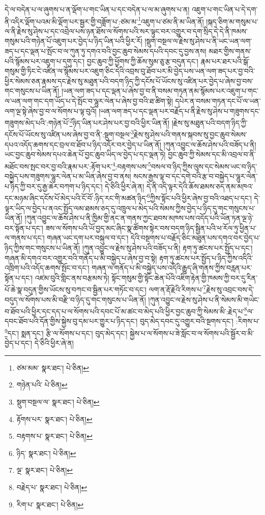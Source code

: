 དེ་ལ་བདེན་པ་ལ་ཞུགས་པ་ན་ལྡོག་པ་གང་ཡིན་པ་དང་བདེན་པ་ལ་མ་ཞུགས་པ་ན། འཇུག་པ་གང་ཡིན་པ་དེ་དག་ནི་འདིར་ལྡོག་པའམ་མི་ལྡོག་པར་སྦྱར་གྱི་བཟློག་པ་:ཙམ་མ་\footnote{ཙམ་མམ་  སྣར་ཐང་།  པེ་ཅིན། }འཇུག་པ་ཙམ་ནི་མ་ཡིན་ནོ། །སྐད་ཅིག་མ་གསུམ་པ་ལ་ནི་རྗེས་སུ་ཤེས་པ་དང་འབྲེལ་པས་ཉན་ཐོས་ལ་སོགས་པའི་སར་ལྟུང་བར་འགྱུར་བ་དག་སྲིད་དེ་དེ་ནི་ཁམས་གསུམ་པའི་གཉེན་པོ་འཇུག་པར་བྱེད་པ་ཉིད་ཡིན་པའི་ཕྱིར་རོ། །སྡུག་བསྔལ་ལ་རྗེས་སུ་ཤེས་པ་ནི་ཡང་ཡན་ལག་ཟད་པ་དང་ལྡན་པ་སྤོང་བ་ལ་ཀུན་ཏུ་དགའ་བའི་བྱང་ཆུབ་སེམས་དཔའི་དབང་དུ་བྱས་ནས། མཐར་གྱིས་གནས་པའི་སྙོམས་པར་འཇུག་པ་དགུ་དང་། བྱང་ཆུབ་ཀྱི་ཕྱོགས་ཀྱི་ཆོས་སུམ་ཅུ་རྩ་བདུན་དང་། རྣམ་པར་ཐར་པའི་སྒོ་གསུམ་གྱི་ཏིང་ངེ་འཛིན་ལ་སྙོམས་པར་འཇུག་ཅིང་དེའི་འབྲས་བུ་ཐོབ་པར་མི་བྱེད་པས་ཡན་ལག་ཟད་པར་བྱ་བའི་ཕྱིར་སེམས་ཅན་རྣམས་དང་རྗེས་སུ་མཐུན་པའི་བདག་ཉིད་ཀྱི་དངོས་པོ་ཡོངས་སུ་འཛིན་པར་བྱེད་པ་ཞེས་བྱ་བས་གང་གསུངས་པ་ཡིན་ནོ། །ཡན་ལག་ཟད་པ་དང་ལྡན་པ་ཞེས་བྱ་བ་ནི་བསམ་གཏན་ནམ་སྙོམས་པར་འཇུག་པ་གང་ལ་ཡན་ལག་གང་དག་ཡོད་པ་དེ་སྤོང་བ་ལྷུར་ལེན་པ་ཞེས་བྱ་བའི་ཐ་ཚིག་སྟེ། དཔེར་ན་བསམ་གཏན་དང་པོ་ལ་ཡན་ལག་ལྔ་སྟེ་ཞེས་བྱ་བ་ལ་སོགས་པ་ལྟ་བུའོ། །ཡན་ལག་ཟད་པ་དང་ལྡན་པར་བརྗོད་པ་ནི་རྗེས་སུ་ཤེས་པ་གཟུགས་དང་གཟུགས་མེད་པའི་:གཉེན་པོ་\footnote{གཉེན་པའི་  པེ་ཅིན། }ཉིད་ཡིན་པར་ཤེས་པར་བྱ་བའི་ཕྱིར་ཡིན་ནོ། །རྗེས་སུ་མཐུན་པའི་བདག་ཉིད་ཀྱི་དངོས་པོ་ཡོངས་སུ་འཛིན་པས་ཞེས་བྱ་བ་ནི་:སྡུག་བསྔལ་\footnote{སྡུག་བསྔལ་ལ་  སྣར་ཐང་།  པེ་ཅིན། }རྗེས་སུ་ཤེས་པའི་གནས་སྐབས་སུ་བྱང་ཆུབ་སེམས་དཔའ་འདོད་ཆགས་དང་བྲལ་བ་ཐོབ་པ་ཉིད་འདོར་བར་བྱེད་པ་ཡིན་ནོ། །ཀུན་འབྱུང་ལ་ཆོས་ཤེས་པའི་བཟོད་པ་ནི། ཡང་བྱང་ཆུབ་སེམས་དཔའ་ཆེན་པོ་བྱང་ཆུབ་ཡིད་ལ་བྱེད་པ་དང་ལྡན་ཏེ། བྱང་ཆུབ་ཀྱི་སེམས་དང་མི་འབྲལ་བ་ནི་མཐོང་བས་སྤང་བར་བྱ་བའི་རྣམ་པར་:རྟོག་པར་\footnote{རྟོགས་པར་  སྣར་ཐང་།  པེ་ཅིན། }:བརྟགས་པས་\footnote{བརྟགས་པ་  སྣར་ཐང་།  པེ་ཅིན། }བསལ་བ་ཉིད་ཀྱིས་ལུས་དང་སེམས་ཡང་བ་ཉིད་བསྐྱེད་པས་གཟུགས་ལྷུར་ལེན་པ་མ་ཡིན་ཞེས་བྱ་བ་ནས། སངས་རྒྱས་ལྟ་བ་དང་དགེ་བའི་རྩ་བ་བསྐྱེད་པ་ལྷུར་ལེན་པ་ཉིད་ཀྱི་བར་དུ་རྒྱ་ཆེར་བཀག་པ་ཉིད་དང་། དེ་ཅིའི་ཕྱིར་ཞེ་ན། དེ་ནི་འདི་ལྟར་དེའི་ཆོས་ཐམས་ཅད་ནམ་མཁའ་དང་མཉམ་ཞིང་དངོས་པོ་མེད་པའི་ངོ་བོ་:ཉིད་རང་གི་མཚན་ཉིད་\footnote{ཉིད་  སྣར་ཐང་།  པེ་ཅིན། }ཀྱིས་སྟོང་པའི་ཕྱིར་ཞེས་བྱ་བའི་འཐད་པ་དང་། དེ་ལྟར་ཡིད་ལ་བྱེད་པ་ནའང་སྤྱོད་ལམ་ཐམས་ཅད་དུ་འཁྲུལ་པ་མེད་པའི་སེམས་ཀྱིས་བྱེད་པ་ཉིད་དུ་གང་གསུངས་པ་ཡིན་ནོ། །ཀུན་འབྱུང་ལ་ཆོས་ཤེས་པ་ནི་ཁྱིམ་གྱི་ནང་ན་གནས་ཀྱང་ཐབས་མཁས་པས་འདོད་པའི་ཡོན་ཏན་ལྔ་ཉེ་བར་སྟོན་པ་དང་། ཟས་ལ་སོགས་པའི་ཡོ་བྱད་མང་ཞིང་སྣ་ཚོགས་སྟེར་བས་བདག་ཉིད་སྦྱིན་པའི་ཕ་རོལ་ཏུ་ཕྱིན་པ་ལ་གནས་པ་དང་། གཞན་ཡང་དག་པར་བསྐུལ་བ་དང་། དེའི་བསྔགས་པ་བརྗོད་ཅིང་མཐུན་པས་དགའ་བར་བྱེད་པ་ཉིད་ཀྱིས་གང་གསུངས་པ་ཡིན་ནོ། །ཀུན་འབྱུང་ལ་རྗེས་སུ་ཤེས་པའི་བཟོད་པ་ནི། རྟག་ཏུ་ཚངས་པར་སྤྱོད་པ་དང་། གཞན་མི་དགའ་བར་འགྱུར་བའི་གནོད་པ་མི་བསྐྱེད་པ་ཞེས་བྱ་བ་སྟེ། རྟག་ཏུ་ཚངས་པར་སྤྱོད་པ་ཉིད་ཀྱིས་འདིའི་འཁྲིག་པའི་འདོད་ཆགས་སྤོང་བ་དང་། གཞན་ལ་གནོད་པ་མི་བསྐྱེད་པས་འདིའི་རྒྱུད་ཞི་གནས་ཀྱིས་བརླན་པར་སྟོན་པ་དང་། འཛམ་བུའི་གླིང་ནས་བརྩམས་ཏེ། སྟོང་གསུམ་གྱི་སྟོང་ཆེན་པོའི་འཇིག་རྟེན་གྱི་ཁམས་ཀྱི་བར་དུ་རིན་པོ་ཆེ་སྣ་བདུན་གྱིས་ཡོངས་སུ་བཀང་བ་སྦྱིན་པར་གཏོང་བ་དང་། ལག་ན་རྡོ་རྗེའི་རིགས་པ་\footnote{ལྔ་  སྣར་ཐང་།  པེ་ཅིན། }རྗེས་སུ་འབྲང་བས་དེ་བདུད་ལ་སོགས་པས་མི་བརྫི་བ་ཉིད་དུ་གང་གསུངས་པ་ཡིན་ནོ། །ཀུན་འབྱུང་ལ་རྗེས་སུ་ཤེས་པ་ནི་སེམས་མི་གཡེང་བ་ཐོབ་པའི་ཕྱིར་དང་དད་པ་ལ་སོགས་པའི་དབང་པོ་མ་ཚང་བ་མེད་པའི་ཕྱིར་བྱང་ཆུབ་ཀྱི་སེམས་མི་:རྗེད་པ་\footnote{བརྗེད་པ་  སྣར་ཐང་།  པེ་ཅིན། }ལ་དབང་ཐོབ་པའི་དོན་གྱིས་སྐྱེས་བུ་དམ་པར་གྱུར་པ་ཉིད་དང་། བུད་མེད་དབང་དུ་འགྱུར་བའི་སྔགས་དང་། :རིགས་པ་\footnote{རིག་པ་  སྣར་ཐང་།  པེ་ཅིན། }དང་། སྨན་དང་། རྩི་ལ་སོགས་པ་དང་། བུད་མེད་དང་། སྐྱེས་པ་ལ་སོགས་པ་ཟེ་སློང་བ་ལ་སོགས་པའི་སྦྱོར་བ་མི་བྱེད་པ་དང་། དེ་ཅིའི་ཕྱིར་ཞེ་ན། 
